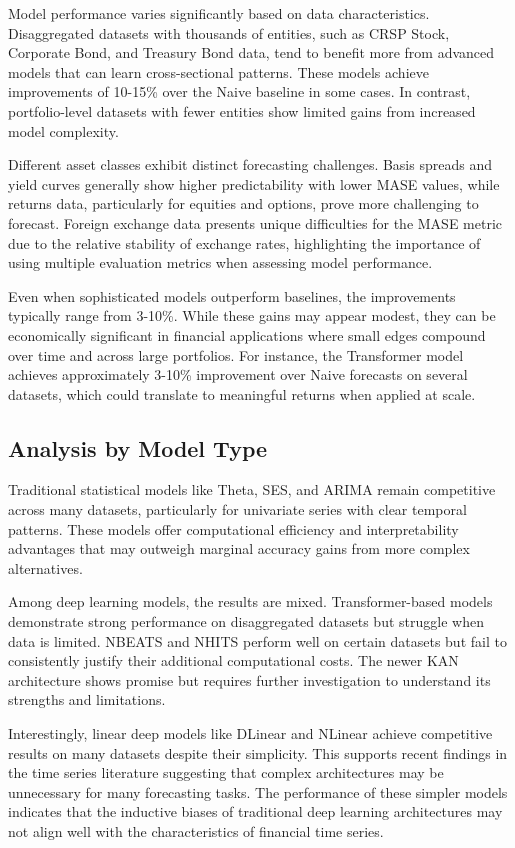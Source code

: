 \documentclass{article}
\begin{document}
Model performance varies significantly based on data characteristics. Disaggregated datasets with thousands of entities, such as CRSP Stock, Corporate Bond, and Treasury Bond data, tend to benefit more from advanced models that can learn cross-sectional patterns. These models achieve improvements of 10-15\% over the Naive baseline in some cases. In contrast, portfolio-level datasets with fewer entities show limited gains from increased model complexity.

Different asset classes exhibit distinct forecasting challenges. Basis spreads and yield curves generally show higher predictability with lower MASE values, while returns data, particularly for equities and options, prove more challenging to forecast. Foreign exchange data presents unique difficulties for the MASE metric due to the relative stability of exchange rates, highlighting the importance of using multiple evaluation metrics when assessing model performance.

Even when sophisticated models outperform baselines, the improvements typically range from 3-10\%. While these gains may appear modest, they can be economically significant in financial applications where small edges compound over time and across large portfolios. For instance, the Transformer model achieves approximately 3-10\% improvement over Naive forecasts on several datasets, which could translate to meaningful returns when applied at scale.

\subsection{Analysis by Model Type}

Traditional statistical models like Theta, SES, and ARIMA remain competitive across many datasets, particularly for univariate series with clear temporal patterns. These models offer computational efficiency and interpretability advantages that may outweigh marginal accuracy gains from more complex alternatives.

Among deep learning models, the results are mixed. Transformer-based models demonstrate strong performance on disaggregated datasets but struggle when data is limited. NBEATS and NHITS perform well on certain datasets but fail to consistently justify their additional computational costs. The newer KAN architecture shows promise but requires further investigation to understand its strengths and limitations.

Interestingly, linear deep models like DLinear and NLinear achieve competitive results on many datasets despite their simplicity. This supports recent findings in the time series literature suggesting that complex architectures may be unnecessary for many forecasting tasks. The performance of these simpler models indicates that the inductive biases of traditional deep learning architectures may not align well with the characteristics of financial time series.
\end{document}
